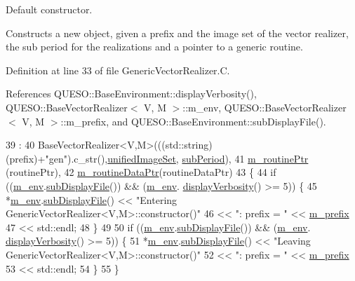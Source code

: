 Default constructor. 

Constructs a new object, given a prefix and the image set of the vector realizer, the sub period for the realizations and a pointer to a generic routine. 

Definition at line 33 of file Generic\-Vector\-Realizer.\-C.



References Q\-U\-E\-S\-O\-::\-Base\-Environment\-::display\-Verbosity(), Q\-U\-E\-S\-O\-::\-Base\-Vector\-Realizer$<$ V, M $>$\-::m\-\_\-env, Q\-U\-E\-S\-O\-::\-Base\-Vector\-Realizer$<$ V, M $>$\-::m\-\_\-prefix, and Q\-U\-E\-S\-O\-::\-Base\-Environment\-::sub\-Display\-File().


\begin{DoxyCode}
39   :
40   BaseVectorRealizer<V,M>(((std::string)(prefix)+\textcolor{stringliteral}{"gen"}).c\_str(),\hyperlink{class_q_u_e_s_o_1_1_base_vector_realizer_ad958991bab8d6369e8a0d66b22a237d4}{unifiedImageSet},
      \hyperlink{class_q_u_e_s_o_1_1_base_vector_realizer_ad9fda59efacf5bd84c472c96dfa00613}{subPeriod}),
41   \hyperlink{class_q_u_e_s_o_1_1_generic_vector_realizer_a913da22606696da4831afc3ef47a3a76}{m\_routinePtr}    (routinePtr),
42   \hyperlink{class_q_u_e_s_o_1_1_generic_vector_realizer_ad2c00300197c0a97bc43b55ea25c16cd}{m\_routineDataPtr}(routineDataPtr)
43 \{
44   \textcolor{keywordflow}{if} ((\hyperlink{class_q_u_e_s_o_1_1_base_vector_realizer_acde246c52f82d8ed687d91cfac14c29c}{m\_env}.\hyperlink{class_q_u_e_s_o_1_1_base_environment_a8a0064746ae8dddfece4229b9ad374d6}{subDisplayFile}()) && (\hyperlink{class_q_u_e_s_o_1_1_base_vector_realizer_acde246c52f82d8ed687d91cfac14c29c}{m\_env}.
      \hyperlink{class_q_u_e_s_o_1_1_base_environment_a1fe5f244fc0316a0ab3e37463f108b96}{displayVerbosity}() >= 5)) \{
45     *\hyperlink{class_q_u_e_s_o_1_1_base_vector_realizer_acde246c52f82d8ed687d91cfac14c29c}{m\_env}.\hyperlink{class_q_u_e_s_o_1_1_base_environment_a8a0064746ae8dddfece4229b9ad374d6}{subDisplayFile}() << \textcolor{stringliteral}{"Entering GenericVectorRealizer<V,M>::constructor()"}
46                             << \textcolor{stringliteral}{": prefix = "} << \hyperlink{class_q_u_e_s_o_1_1_base_vector_realizer_ac5559b6921816ccaed7afc2d342c2a32}{m\_prefix}
47                             << std::endl;
48   \}
49 
50   \textcolor{keywordflow}{if} ((\hyperlink{class_q_u_e_s_o_1_1_base_vector_realizer_acde246c52f82d8ed687d91cfac14c29c}{m\_env}.\hyperlink{class_q_u_e_s_o_1_1_base_environment_a8a0064746ae8dddfece4229b9ad374d6}{subDisplayFile}()) && (\hyperlink{class_q_u_e_s_o_1_1_base_vector_realizer_acde246c52f82d8ed687d91cfac14c29c}{m\_env}.
      \hyperlink{class_q_u_e_s_o_1_1_base_environment_a1fe5f244fc0316a0ab3e37463f108b96}{displayVerbosity}() >= 5)) \{
51     *\hyperlink{class_q_u_e_s_o_1_1_base_vector_realizer_acde246c52f82d8ed687d91cfac14c29c}{m\_env}.\hyperlink{class_q_u_e_s_o_1_1_base_environment_a8a0064746ae8dddfece4229b9ad374d6}{subDisplayFile}() << \textcolor{stringliteral}{"Leaving GenericVectorRealizer<V,M>::constructor()"}
52                             << \textcolor{stringliteral}{": prefix = "} << \hyperlink{class_q_u_e_s_o_1_1_base_vector_realizer_ac5559b6921816ccaed7afc2d342c2a32}{m\_prefix}
53                             << std::endl;
54   \}
55 \}
\end{DoxyCode}
